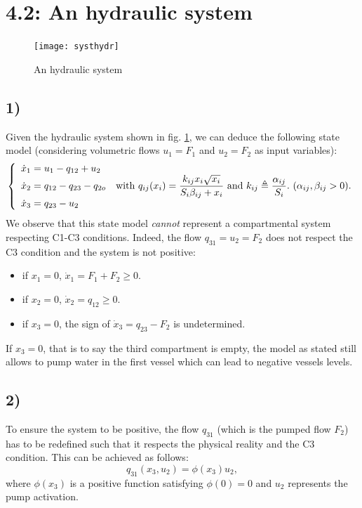 \section*{4.2: An hydraulic system}
\begin{figure}[h!]
  \centering
  \texttt{[image: systhydr]}
  \caption{An hydraulic system}
  \label{syshydr}
\end{figure}

\subsection*{1)}
Given the hydraulic system shown in fig. \ref{syshydr}, we can deduce the following state model (considering volumetric flows $u_1=F_1$ and $u_2=F_2$ as input variables):
\begin{equation}
\left\{
  \begin{array}{l r}
  \dot{x}_1=u_1-q_{12}+u_2 &\\
  \dot{x}_2=q_{12}-q_{23}-q_{2o} & \textnormal{with } q_{ij}(x_i)=\dfrac{k_{ij}x_i\sqrt{x_i}}{S_i\beta_{ij}+x_i} \textnormal{ and } k_{ij}\triangleq\dfrac{\alpha_{ij}}{S_i}.~(\alpha_{ij},\beta_{ij}>0).\\
  \dot{x}_3=q_{23}-u_2 &\\
  \end{array} \right.
\label{eq:statemod}
\end{equation}
We observe that this state model {\it cannot} represent a compartmental system respecting C1-C3 conditions.
Indeed, the flow $q_{31} = u_2=F_2$ does not respect the C3 condition and the system is not positive:
\begin{itemize}
\item if $x_1=0$, $\dot{x}_1=F_1+F_2\geq 0$.
\item if $x_2=0$, $\dot{x}_2=q_{12}\geq 0$.
\item if $x_3=0$, the sign of $\dot{x}_3=q_{23}-F_2$ is undetermined.
\end{itemize}
If $x_3 =0$, that is to say the third compartment is empty, the model as stated still allows to pump water in the first vessel which can lead to negative vessels levels.

\subsection*{2)}
To ensure the system to be positive, the flow $q_{31}$ (which is the pumped flow $F_2$) has to be redefined such that it respects the physical reality and the C3 condition. This can be achieved as follows:
\begin{equation}
q_{31}(x_3,u_2) = \phi(x_3)u_2,
\label{eq:q31}
\end{equation}
where $\phi(x_3)$ is a positive function satisfying $\phi(0) = 0$ and $u_2$ represents the pump activation.

